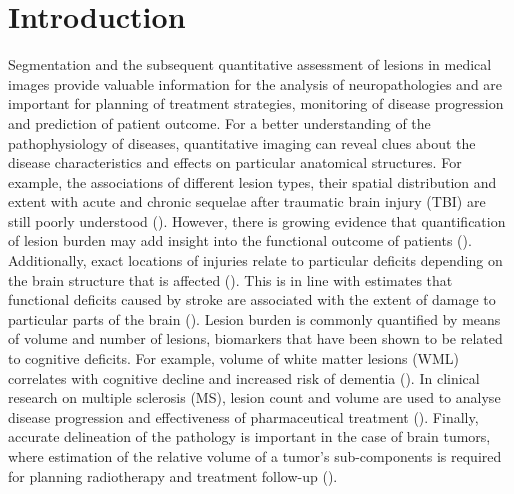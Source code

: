 \documentclass[preprint,authoryear,12pt]{elsarticle}
\begin{document}
\section{Introduction}

Segmentation and the subsequent quantitative assessment of lesions in medical images provide valuable information for the analysis of neuropathologies and are important for planning of treatment strategies, monitoring of disease progression and prediction of patient outcome. For a better understanding of the pathophysiology of diseases, quantitative imaging can reveal clues about the disease characteristics and effects on particular anatomical structures. For example, the associations of different lesion types, their spatial distribution and extent with acute and chronic sequelae after traumatic brain injury (TBI) are still poorly understood (\cite{Maas2015}). However, there is growing evidence that quantification of lesion burden may add insight into the functional outcome of patients (\cite{Ding2008,Moen2012}). Additionally, exact locations of injuries relate to particular deficits depending on the brain structure that is affected (\cite{lehtonen2005neuropsychological, Warner2010d, Sharp2011}). This is in line with estimates that functional deficits caused by stroke are associated with the extent of damage to particular parts of the brain (\cite{carey2013beyond}). Lesion burden is commonly quantified by means of volume and number of lesions, biomarkers that have been shown to be related to cognitive deficits. For example, volume of white matter lesions (WML) correlates with cognitive decline and increased risk of dementia (\cite{Ikram2010}). In clinical research on multiple sclerosis (MS), lesion count and volume are used to analyse disease progression and effectiveness of pharmaceutical treatment (\cite{Rovira2008,Kappos2007}). Finally, accurate delineation of the pathology is important in the case of brain tumors, where estimation of the relative volume of a tumor's sub-components is required for planning radiotherapy and treatment follow-up (\cite{Wen2010}).
\end{document}
